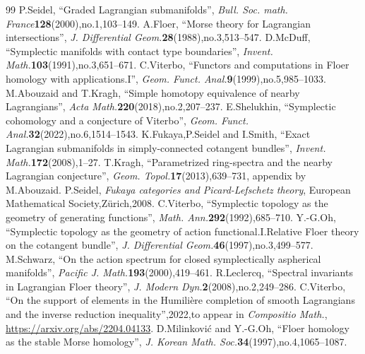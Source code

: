 \documentclass[10pt,a4paper]{amsart}
\theoremstyle{definition}
\begin{document}
\begin{thebibliography}{99}
 P.Seidel, ``Graded Lagrangian submanifolds'', \emph{Bull. Soc. math. France}\textbf{128}(2000),no.1,103--149.
 A.Floer, ``Morse theory for Lagrangian intersections'', \emph{J. Differential Geom.}\textbf{28}(1988),no.3,513--547.
 D.McDuff, ``Symplectic manifolds with contact type boundaries'', \emph{Invent. Math.}\textbf{103}(1991),no.3,651--671.
 C.Viterbo, ``Functors and computations in Floer homology with applications.I'', \emph{Geom. Funct. Anal.}\textbf{9}(1999),no.5,985--1033.
 M.Abouzaid and T.Kragh, ``Simple homotopy equivalence of nearby Lagrangians'', \emph{Acta Math.}\textbf{220}(2018),no.2,207--237.
 E.Shelukhin, ``Symplectic cohomology and a conjecture of Viterbo'', \emph{Geom. Funct. Anal.}\textbf{32}(2022),no.6,1514--1543.
 K.Fukaya,P.Seidel and I.Smith, ``Exact Lagrangian submanifolds in simply-connected cotangent bundles'', \emph{Invent. Math.}\textbf{172}(2008),1--27.
 T.Kragh, ``Parametrized ring-spectra and the nearby Lagrangian conjecture'', \emph{Geom. Topol.}\textbf{17}(2013),639--731, appendix by M.Abouzaid.
 P.Seidel, \emph{Fukaya categories and Picard-Lefschetz theory}, European Mathematical Society,Zürich,2008.
 C.Viterbo, ``Symplectic topology as the geometry of generating functions'', \emph{Math. Ann.}\textbf{292}(1992),685--710.
 Y.-G.Oh, ``Symplectic topology as the geometry of action functional.I.Relative Floer theory on the cotangent bundle'', \emph{J. Differential Geom.}\textbf{46}(1997),no.3,499--577.
 M.Schwarz, ``On the action spectrum for closed symplectically aspherical manifolds'', \emph{Pacific J. Math.}\textbf{193}(2000),419--461.
 R.Leclercq, ``Spectral invariants in Lagrangian Floer theory'', \emph{J. Modern Dyn.}\textbf{2}(2008),no.2,249--286.
 C.Viterbo, ``On the support of elements in the Humilière completion of smooth Lagrangians and the inverse reduction inequality'',2022,to appear in \emph{Compositio Math.}, \url{https://arxiv.org/abs/2204.04133}.
 D.Milinković and Y.-G.Oh, ``Floer homology as the stable Morse homology'', \emph{J. Korean Math. Soc.}\textbf{34}(1997),no.4,1065--1087.

\end{thebibliography}
\end{document}
